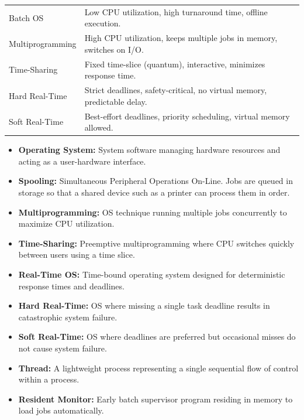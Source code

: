 \documentclass[12pt,a4paper]{article}
\renewcommand{\arraystretch}{1.45}
\begin{document}
\begin{tcolorbox}[formulabox, title={\textbf{Key Evolution Properties at a Glance}}]
\renewcommand{\arraystretch}{1.3}
\begin{tabularx}{\linewidth}{B{3.8cm} X}
Batch OS & Low CPU utilization, high turnaround time, offline execution. \\[4pt]
Multiprogramming & High CPU utilization, keeps multiple jobs in memory, switches on I/O. \\[4pt]
Time-Sharing & Fixed time-slice (quantum), interactive, minimizes response time. \\[4pt]
Hard Real-Time & Strict deadlines, safety-critical, no virtual memory, predictable delay. \\[4pt]
Soft Real-Time & Best-effort deadlines, priority scheduling, virtual memory allowed.
\end{tabularx}
\end{tcolorbox}

\begin{tcolorbox}[defbox, title={\textbf{One-Line Definitions}}]
\begin{itemize}[leftmargin=*, itemsep=2.5pt, topsep=0pt]
  \item \textbf{Operating System:} System software managing hardware resources and acting as a user-hardware interface.
  \item \textbf{Spooling:} Simultaneous Peripheral Operations On-Line. Jobs are queued in storage so that a shared device such as a printer can process them in order.
  \item \textbf{Multiprogramming:} OS technique running multiple jobs concurrently to maximize CPU utilization.
  \item \textbf{Time-Sharing:} Preemptive multiprogramming where CPU switches quickly between users using a time slice.
  \item \textbf{Real-Time OS:} Time-bound operating system designed for deterministic response times and deadlines.
  \item \textbf{Hard Real-Time:} OS where missing a single task deadline results in catastrophic system failure.
  \item \textbf{Soft Real-Time:} OS where deadlines are preferred but occasional misses do not cause system failure.
  \item \textbf{Thread:} A lightweight process representing a single sequential flow of control within a process.
  \item \textbf{Resident Monitor:} Early batch supervisor program residing in memory to load jobs automatically.
\end{itemize}
\end{tcolorbox}
\end{document}
